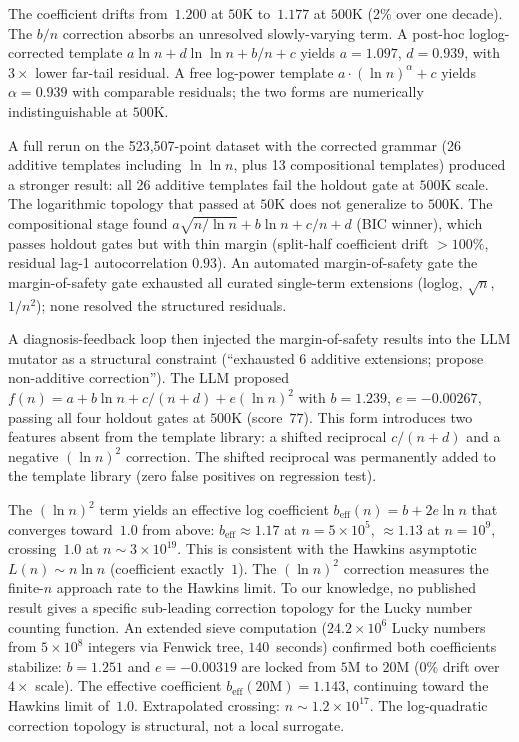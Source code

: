 \documentclass[12pt]{article}
\begin{document}
The coefficient drifts from~$1.200$ at $50$K to~$1.177$ at $500$K (2\% over one decade). The $b/n$ correction absorbs an unresolved slowly-varying term. A post-hoc loglog-corrected template $a \ln n + d \ln\ln n + b/n + c$ yields $a = 1.097$, $d = 0.939$, with $3\times$ lower far-tail residual. A free log-power template $a \cdot (\ln n)^\alpha + c$ yields $\alpha = 0.939$ with comparable residuals; the two forms are numerically indistinguishable at $500$K.

A full rerun on the 523{,}507-point dataset with the corrected grammar (26 additive templates including $\ln\ln n$, plus 13 compositional templates) produced a stronger result: all 26 additive templates fail the holdout gate at $500$K scale. The logarithmic topology that passed at $50$K does not generalize to $500$K. The compositional stage found $a\sqrt{n/\ln n} + b\ln n + c/n + d$ (BIC winner), which passes holdout gates but with thin margin (split-half coefficient drift $>100\%$, residual lag-1 autocorrelation $0.93$). An automated margin-of-safety gate the margin-of-safety gate exhausted all curated single-term extensions (loglog, $\sqrt{n}$, $1/n^2$); none resolved the structured residuals.

A diagnosis-feedback loop then injected the margin-of-safety results into the LLM mutator as a structural constraint (``exhausted 6 additive extensions; propose non-additive correction''). The LLM proposed $f(n) = a + b \ln n + c/(n+d) + e(\ln n)^2$ with $b = 1.239$, $e = -0.00267$, passing all four holdout gates at $500$K (score~$77$). This form introduces two features absent from the template library: a shifted reciprocal $c/(n+d)$ and a negative $(\ln n)^2$ correction. The shifted reciprocal was permanently added to the template library (zero false positives on regression test).

The $(\ln n)^2$ term yields an effective log coefficient $b_{\mathrm{eff}}(n) = b + 2e\ln n$ that converges toward~$1.0$ from above: $b_{\mathrm{eff}} \approx 1.17$ at $n = 5 \times 10^5$, $\approx 1.13$ at $n = 10^9$, crossing~$1.0$ at $n \sim 3 \times 10^{19}$. This is consistent with the Hawkins asymptotic $L(n) \sim n \ln n$ (coefficient exactly~$1$). The $(\ln n)^2$ correction measures the finite-$n$ approach rate to the Hawkins limit. To our knowledge, no published result gives a specific sub-leading correction topology for the Lucky number counting function. An extended sieve computation ($24.2 \times 10^6$ Lucky numbers from $5 \times 10^8$ integers via Fenwick tree, $140$~seconds) confirmed both coefficients stabilize: $b = 1.251$ and $e = -0.00319$ are locked from $5$M to $20$M ($0\%$ drift over $4\times$ scale). The effective coefficient $b_{\mathrm{eff}}(20\mathrm{M}) = 1.143$, continuing toward the Hawkins limit of~$1.0$. Extrapolated crossing: $n \sim 1.2 \times 10^{17}$. The log-quadratic correction topology is structural, not a local surrogate.
\end{document}
